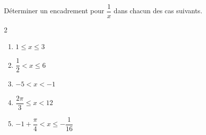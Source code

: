 \begin{exo}{}
	Déterminer un encadrement pour $\dfrac{1}{x}$ dans chacun des cas suivants.
	\vspace*{-2mm}
	\begin{multicols}{2}
		\begin{enumerate}[itemsep=2mm]
			\item $1 \le x \le 3$
			\item $\dfrac{1}{2} < x \le 6$
			\item $-5 < x < -1$
			\item $\dfrac{2\pi}{3} \le x < 12$
			\item $-1 + \dfrac{\pi}{4} < x \le -\dfrac{1}{16}$
		\end{enumerate}
	\end{multicols}\vspace*{-2mm}
\end{exo}
